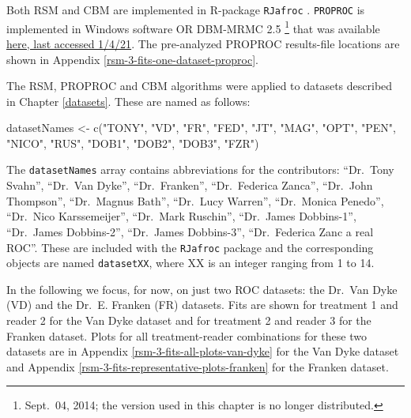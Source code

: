 \documentclass[
]{book}
\newenvironment{Shaded}{\begin{snugshade}}{\end{snugshade}}
\newcommand{\FunctionTok}[1]{\textcolor[rgb]{0.00,0.00,0.00}{#1}}
\newcommand{\NormalTok}[1]{#1}
\newcommand{\OtherTok}[1]{\textcolor[rgb]{0.56,0.35,0.01}{#1}}
\newcommand{\StringTok}[1]{\textcolor[rgb]{0.31,0.60,0.02}{#1}}
\begin{document}
Both RSM and CBM are implemented in R-package \texttt{RJafroc} \citep{R-RJafroc}. \texttt{PROPROC} is implemented in Windows software OR DBM-MRMC 2.5 \footnote{Sept.~04, 2014; the version used in this chapter is no longer distributed.} that was available \href{https://perception.lab.uiowa.edu/software}{here, last accessed 1/4/21}. The pre-analyzed PROPROC results-file locations are shown in Appendix \ref{rsm-3-fits-one-dataset-proproc}.

The RSM, PROPROC and CBM algorithms were applied to datasets described in Chapter \ref{datasets}. These are named as follows:

\begin{Shaded}
\begin{Highlighting}[]
\NormalTok{datasetNames }\OtherTok{\textless{}{-}}  
  \FunctionTok{c}\NormalTok{(}\StringTok{"TONY"}\NormalTok{, }\StringTok{"VD"}\NormalTok{, }\StringTok{"FR"}\NormalTok{, }
  \StringTok{"FED"}\NormalTok{, }\StringTok{"JT"}\NormalTok{, }\StringTok{"MAG"}\NormalTok{, }
  \StringTok{"OPT"}\NormalTok{, }\StringTok{"PEN"}\NormalTok{, }\StringTok{"NICO"}\NormalTok{,}
  \StringTok{"RUS"}\NormalTok{, }\StringTok{"DOB1"}\NormalTok{, }\StringTok{"DOB2"}\NormalTok{, }
  \StringTok{"DOB3"}\NormalTok{, }\StringTok{"FZR"}\NormalTok{)}
\end{Highlighting}
\end{Shaded}

The \texttt{datasetNames} array contains abbreviations for the contributors: ``Dr.~Tony Svahn'', ``Dr.~Van Dyke'', ``Dr.~Franken'', ``Dr.~Federica Zanca'', ``Dr.~John Thompson'', ``Dr.~Magnus Bath'', ``Dr.~Lucy Warren'', ``Dr.~Monica Penedo'', ``Dr.~Nico Karssemeijer'', ``Dr.~Mark Ruschin'', ``Dr.~James Dobbins-1'', ``Dr.~James Dobbins-2'', ``Dr.~James Dobbins-3'', ``Dr.~Federica Zanc a real ROC''. These are included with the \texttt{RJafroc} package and the corresponding objects are named \texttt{datasetXX}, where XX is an integer ranging from 1 to 14.

In the following we focus, for now, on just two ROC datasets: the Dr.~Van Dyke (VD) and the Dr.~E. Franken (FR) datasets. Fits are shown for treatment 1 and reader 2 for the Van Dyke dataset and for treatment 2 and reader 3 for the Franken dataset. Plots for all treatment-reader combinations for these two datasets are in Appendix \ref{rsm-3-fits-all-plots-van-dyke} for the Van Dyke dataset and Appendix \ref{rsm-3-fits-representative-plots-franken} for the Franken dataset.
\end{document}
